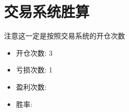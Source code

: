 \chapter{交易系统胜算}
注意这一定是按照交易系统的开仓次数
\begin{itemize}
\item 开仓次数: 3
\item 亏损次数: 1
\item 盈利次数:
\item 胜率:
\end{itemize}